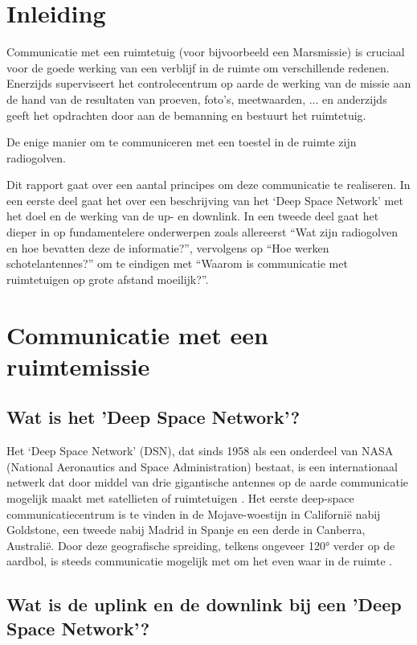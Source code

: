 \section{Inleiding}

Communicatie met een ruimtetuig (voor bijvoorbeeld een Marsmissie) is cruciaal voor de goede werking van een verblijf in de ruimte om verschillende redenen. Enerzijds superviseert het controlecentrum op aarde de werking van de missie aan de hand van de resultaten van proeven, foto’s, meetwaarden, ... en anderzijds geeft het opdrachten door aan de bemanning en bestuurt het ruimtetuig.

De enige manier om te communiceren met een toestel in de ruimte zijn radiogolven.

Dit rapport gaat over een aantal principes om deze communicatie te realiseren. In een eerste deel gaat het over een beschrijving van het ‘Deep Space Network’ met het doel en de werking van de up- en downlink. In een tweede deel gaat het dieper in op fundamentelere onderwerpen zoals allereerst “Wat zijn radiogolven en hoe bevatten deze de informatie?”, vervolgens op “Hoe werken schotelantennes?” om te eindigen met “Waarom is communicatie met ruimtetuigen op grote afstand moeilijk?”.

\section{Communicatie met een ruimtemissie}

\subsection{Wat is het 'Deep Space Network'?}

Het ‘Deep Space Network’ (DSN), dat sinds 1958 als een onderdeel van NASA (National Aeronautics and Space Administration) bestaat, is een internationaal netwerk dat door middel van drie gigantische antennes op de aarde communicatie mogelijk maakt met satellieten of ruimtetuigen \cite{martin}. Het eerste deep-space communicatiecentrum is te vinden in de Mojave-woestijn in Californië nabij Goldstone, een tweede nabij Madrid in Spanje en een derde in Canberra, Australië. Door deze geografische spreiding, telkens ongeveer 120° verder op de aardbol, is steeds communicatie mogelijk met om het even waar in de ruimte \cite{christiaens}.

\subsection{Wat is de uplink en de downlink bij een 'Deep Space Network'?}

